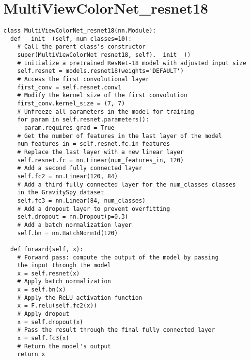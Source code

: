 \chapter{MultiViewColorNet\_resnet18}
\label{appendix1}
\begin{verbatim}
class MultiViewColorNet_resnet18(nn.Module):
  def __init__(self, num_classes=10):
    # Call the parent class's constructor
    super(MultiViewColorNet_resnet18, self).__init__()
    # Initialize a pretrained ResNet-18 model with adjusted input size
    self.resnet = models.resnet18(weights='DEFAULT')
    # Access the first convolutional layer
    first_conv = self.resnet.conv1
    # Modify the kernel size of the first convolution
    first_conv.kernel_size = (7, 7)
    # Unfreeze all parameters in the model for training
    for param in self.resnet.parameters():
      param.requires_grad = True
    # Get the number of features in the last layer of the model
    num_features_in = self.resnet.fc.in_features
    # Replace the last layer with a new linear layer
    self.resnet.fc = nn.Linear(num_features_in, 120)
    # Add a second fully connected layer
    self.fc2 = nn.Linear(120, 84)
    # Add a third fully connected layer for the num_classes classes 
    in the GravitySpy dataset
    self.fc3 = nn.Linear(84, num_classes)
    # Add a dropout layer to prevent overfitting
    self.dropout = nn.Dropout(p=0.3)
    # Add a batch normalization layer
    self.bn = nn.BatchNorm1d(120)

  def forward(self, x):
    # Forward pass: compute the output of the model by passing 
    the input through the model
    x = self.resnet(x)
    # Apply batch normalization
    x = self.bn(x)
    # Apply the ReLU activation function
    x = F.relu(self.fc2(x))
    # Apply dropout
    x = self.dropout(x)
    # Pass the result through the final fully connected layer
    x = self.fc3(x)
    # Return the model's output
    return x
\end{verbatim}